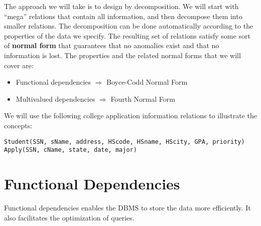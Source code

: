 The approach we will take is to design by decomposition. We will start with ``mega'' relations that contain all information, and then decompose them into smaller relations. The decomposition can be done automatically according to the properties of the data we specify. The resulting set of relations satisfy some sort of \textbf{normal form} that guarantees that no anomalies exist and that no information is lost. The properties and the related normal forms that we will cover are:
\begin{itemize}
\item Functional dependencies $\Rightarrow$ Boyce-Codd Normal Form
\item Multivalued dependencies $\Rightarrow$ Fourth Normal Form
\end{itemize}
 We will use the following college application information relations to illustrate the concepts:
\begin{lstlisting}
Student(SSN, sName, address, HScode, HSname, HScity, GPA, priority)
Apply(SSN, cName, state, date, major)
\end{lstlisting}
\section{Functional Dependencies}
Functional dependencies enables the DBMS to store the data more efficiently. It also facilitates the optimization of queries.

